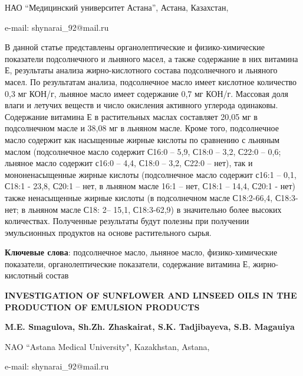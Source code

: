 \begin{affiliation}
НАО ``Медицинский университет Астана'', Астана, Казахстан,

e-mail: shynarai\_92@mail.ru
\end{affiliation}

В данной статье представлены органолептические и физико-химические
показатели подсолнечного и льняного масел, а также содержание в них
витамина Е, результаты анализа жирно-кислотного состава подсолнечного и
льняного масел. По результатам анализа, подсолнечное масло имеет
кислотное количество 0,3 мг КОН/г, льняное масло имеет содержание 0,7 мг
КОН/г. Массовая доля влаги и летучих веществ и число окисления активного
углерода одинаковы. Содержание витамина Е в растительных маслах
составляет 20,05 мг в подсолнечном масле и 38,08 мг в льняном масле.
Кроме того, подсолнечное масло содержит как насыщенные жирные кислоты по
сравнению с льняным маслом (подсолнечное масло содержит С16:0 -- 5,9,
С18:0 -- 3,2, С22:0 -- 0,6; льняное масло содержит с16:0 -- 4,4, С18:0
-- 3,2, С22:0 -- нет), так и мононенасыщенные жирные кислоты
(подсолнечное масло содержит с16:1 -- 0,1, С18:1 - 23,8, С20:1 -- нет, в
льняном масле 16:1 -- нет, С18:1 -- 14,4, С20:1 - нет) также
ненасыщенные жирные кислоты (в подсолнечном масле С18:2-66,4, С18:3-нет;
в льняном масле С18: 2-- 15,1, С18:3-62,9) в значительно более высоких
количествах. Полученные результаты будут полезны при получении
эмульсионных продуктов на основе растительного сырья.

{\bfseries Ключевые слова}: подсолнечное масло, льняное масло,
физико-химические показатели, органолептические показатели, содержание
витамина Е, жирно-кислотный состав

\begin{articleheader}
{\bfseries INVESTIGATION OF SUNFLOWER AND LINSEED OILS IN THE PRODUCTION OF
EMULSION PRODUCTS}

{\bfseries
M.E. Smagulova,
Sh.Zh. Zhaskairat\textsuperscript{\envelope },
S.K. Tadjibayeva,
S.B. Magauiya
}
\end{articleheader}

\begin{affiliation}
NAO ``Astana Medical University", Kazakhstan, Astana,

e-mail: shynarai\_92@mail.ru
\end{affiliation}

